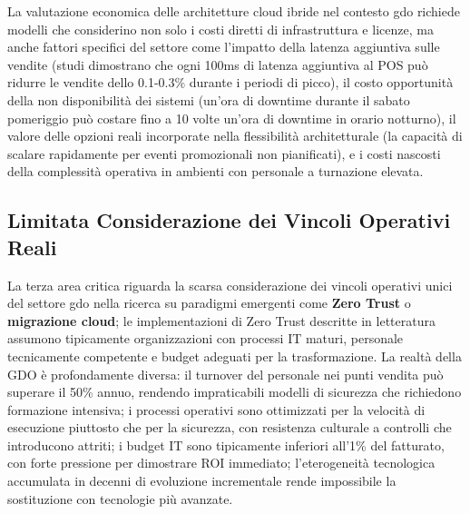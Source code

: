 La valutazione economica delle architetture cloud ibride nel contesto \gls{gdo} richiede modelli che considerino non solo i costi diretti di infrastruttura e licenze, ma anche fattori specifici del settore come l'impatto della latenza aggiuntiva sulle vendite (studi dimostrano che ogni 100ms di latenza aggiuntiva al POS può ridurre le vendite dello 0.1-0.3\% durante i periodi di picco), il costo opportunità della non disponibilità dei sistemi (un'ora di downtime durante il sabato pomeriggio può costare fino a 10 volte un'ora di downtime in orario notturno), il valore delle opzioni reali incorporate nella flessibilità architetturale (la capacità di scalare rapidamente per eventi promozionali non pianificati), e i costi nascosti della complessità operativa in ambienti con personale a turnazione elevata.

\subsection{Limitata Considerazione dei Vincoli Operativi Reali}

La terza area critica riguarda la scarsa considerazione dei vincoli operativi unici del settore \gls{gdo} nella ricerca su paradigmi emergenti come \textbf{Zero Trust} o \textbf{migrazione cloud}; le implementazioni di Zero Trust descritte in letteratura assumono tipicamente organizzazioni con processi IT maturi, personale tecnicamente competente e budget adeguati per la trasformazione. La realtà della GDO è profondamente diversa: il turnover del personale nei punti vendita può superare il 50\% annuo, rendendo impraticabili modelli di sicurezza che richiedono formazione intensiva; i processi operativi sono ottimizzati per la velocità di esecuzione piuttosto che per la sicurezza, con resistenza culturale a controlli che introducono attriti; i budget IT sono tipicamente inferiori all'1\% del fatturato, con forte pressione per dimostrare ROI immediato; l'eterogeneità tecnologica accumulata in decenni di evoluzione incrementale rende impossibile la sostituzione con tecnologie più avanzate.


